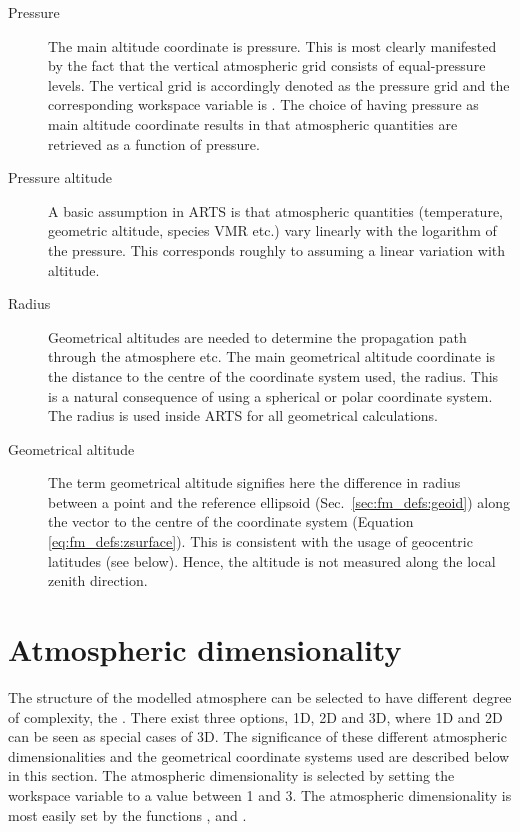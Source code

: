 \begin{description}
  
\item[Pressure] The main altitude coordinate is
  pressure. This is most clearly manifested by the fact that the
  vertical atmospheric grid consists of equal-pressure levels.
  The vertical grid is accordingly denoted as the pressure grid and
  the corresponding workspace variable is . The
  choice of having pressure as main altitude coordinate results in
  that atmospheric quantities are retrieved as a function of pressure.
  
\item[Pressure altitude] A basic assumption
  in ARTS is that atmospheric quantities (temperature, geometric
  altitude, species VMR etc.) vary linearly with the logarithm of the
  pressure. This corresponds roughly to assuming a linear variation
  with altitude. 

\item[Radius] Geometrical altitudes are
  needed to determine the propagation path through the atmosphere etc.
  The main geometrical altitude coordinate is the distance to the
  centre of the coordinate system used, the radius. This is a natural
  consequence of using a spherical or polar coordinate system. The
  radius is used inside ARTS for all geometrical calculations.
  
\item[Geometrical altitude] The term geometrical
  altitude signifies here the difference in radius between a point and the
  reference ellipsoid (Sec.~\ref{sec:fm_defs:geoid}) along the vector to the
  centre of the coordinate system (Equation \ref{eq:fm_defs:zsurface}). This is
  consistent with the usage of geocentric latitudes (see below). Hence, the
  altitude is not measured along the local zenith direction.
\end{description}



\section{Atmospheric dimensionality}
\label{sec:fm_defs:atmdim}

The structure of the modelled atmosphere can be selected to have different
degree of complexity, the . There exist
three options, 1D, 2D and 3D, where 1D and 2D can be seen as special cases of
3D. The significance of these different atmospheric dimensionalities and the
geometrical coordinate systems used are described below in this section. The
atmospheric dimensionality is selected by setting the workspace variable
 to a value between 1 and 3. The atmospheric
dimensionality is most easily set by the functions ,
 and .

